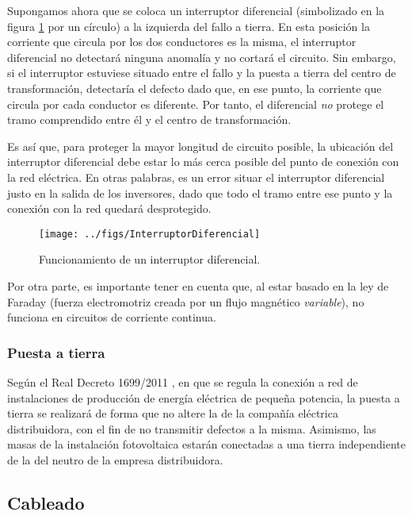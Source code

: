 Supongamos ahora que se coloca un interruptor diferencial (simbolizado
en la figura \ref{fig:FuncionamientoDiferencial} por un círculo) a la
izquierda del fallo a tierra. En esta posición la corriente que
circula por los dos conductores es la misma, el interruptor
diferencial no detectará ninguna anomalía y no cortará el
circuito. Sin embargo, si el interruptor estuviese situado entre el
fallo y la puesta a tierra del centro de transformación, detectaría el
defecto dado que, en ese punto, la corriente que circula por cada
conductor es diferente. Por tanto, el diferencial \emph{no} protege el
tramo comprendido entre él y el centro de transformación. 

Es así que, para proteger la mayor longitud de circuito posible, la
ubicación del interruptor diferencial debe estar lo más cerca posible
del punto de conexión con la red eléctrica. En otras palabras, es un
error situar el interruptor diferencial justo en la salida de los
inversores, dado que todo el tramo entre ese punto y la conexión con
la red quedará desprotegido.

%
\begin{figure}
\begin{centering}
\texttt{[image: ../figs/InterruptorDiferencial]}
\end{centering}

\caption{Funcionamiento de un interruptor diferencial.\label{fig:FuncionamientoDiferencial}}

\end{figure}


Por otra parte, es importante tener en cuenta que, al estar basado
en la ley de Faraday (fuerza electromotriz creada por un flujo magnético
\emph{variable}), no funciona en circuitos de corriente continua.

\subsubsection{Puesta a tierra}

Según el Real Decreto 1699/2011 \cite{RealDecreto2011}, en que se
regula la conexión a red de instalaciones de producción de energía
eléctrica de pequeña potencia, la puesta a tierra se realizará de
forma que no altere la de la compañía eléctrica distribuidora, con el
fin de no transmitir defectos a la misma. Asimismo, las masas de la
instalación fotovoltaica estarán conectadas a una tierra independiente
de la del neutro de la empresa distribuidora.

\subsection{Cableado}

